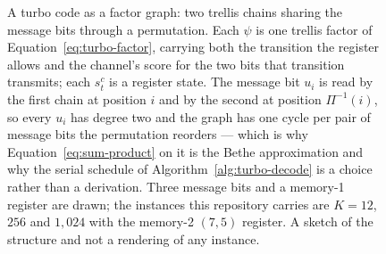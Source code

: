 \begin{figure}[htbp]
\centering
{}
\caption{A turbo code as a factor graph: two trellis chains sharing the
message bits through a permutation. Each $\psi$ is one trellis factor of
Equation~\ref{eq:turbo-factor}, carrying both the transition the register
allows and the channel's score for the two bits that transition transmits;
each $s^{c}_{t}$ is a register state. The message bit $u_i$ is read by the
first chain at position $i$ and by the second at position $\Pi^{-1}(i)$, so
every $u_i$ has degree two and the graph has one cycle per pair of message
bits the permutation reorders --- which is why
Equation~\ref{eq:sum-product} on it is the Bethe approximation and why the
serial schedule of Algorithm~\ref{alg:turbo-decode} is a choice rather than
a derivation. Three message bits and a memory-1 register are drawn; the
instances this repository carries are $K = 12$, $256$ and $1{,}024$ with the
memory-2 $(7,5)$ register. A sketch of the structure and not a rendering of
any instance.}
\label{fig:turbo:sketch}
\end{figure}
